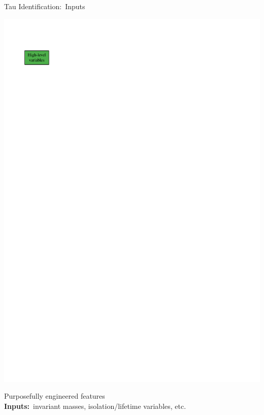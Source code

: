 \documentclass[11pt, xcolor={dvipsnames}, aspectratio=169]{beamer}
\begin{document}
\begin{frame}{Tau Identification:\ Inputs}

  \begin{minipage}[c][2.2cm][c]{0.25\textwidth}
    \centering

    \includegraphics[scale=1]{tauid/high_level_icon}
  \end{minipage}%
  \begin{minipage}[c][2.2cm][c]{0.75\textwidth}
    Purposefully engineered features\\[0.5\baselineskip]
    \textbf{Inputs:}\ invariant masses, isolation/lifetime variables, etc.
  \end{minipage}%

  \pause

  \begin{minipage}[c][2.2cm][c]{0.25\textwidth}
    \centering


\end{minipage}
\end{frame}
\end{document}
